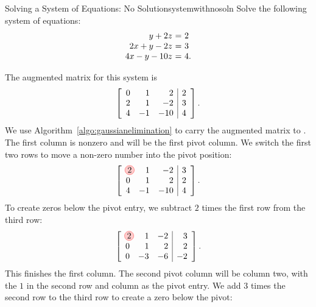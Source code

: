 \begin{example}{Solving a System of Equations: No Solution}{systemwithnosoln}
  Solve the following system of equations:
  \begin{equation*}
    \begin{array}{r@{~}c@{~}l}
           y  +2z &=& 2\\
      2x  +y  -2z &=& 3\\
      4x  -y -10z &=& 4.
    \end{array}
  \end{equation*}
\end{example}

\begin{solution} The augmented matrix for this system is
  \begin{equation*}
    \left[
    \begin{array}{rrr|r}
      0 &  1 &   2 & 2\\
      2 &  1 &  -2 & 3\\
      4 & -1 & -10 & 4      
    \end{array}
    \right].
  \end{equation*}
  We use Algorithm~\ref{algo:gaussianelimination} to carry the
  augmented matrix to {\ef}. The first column is nonzero and will be the
  first pivot column. We switch the first two rows to move a non-zero
  number into the pivot position:
  \begin{equation*}
    \leftB
    \begin{array}{rrr|r}
      \circled{2} &  1 &  -2 & 3\\
      0 &  1 &   2 & 2\\
      4 & -1 & -10 & 4      
    \end{array}
    \rightB.
  \end{equation*}
  To create zeros below the pivot entry, we subtract $2$ times the
  first row from the third row:
  \begin{equation*}
    \leftB
    \begin{array}{rrr|r}
      \circled{2} &  1 &  -2 & 3\\
      0 &  1 &   2 & 2\\
      0 & -3 & -6 & -2      
    \end{array}
    \rightB.
  \end{equation*}
  This finishes the first column. The second pivot column will be
  column two, with the $1$ in the second row and column as the pivot
  entry. We add $3$ times the second row to the third row to create a
  zero below the pivot:

\end{solution}

